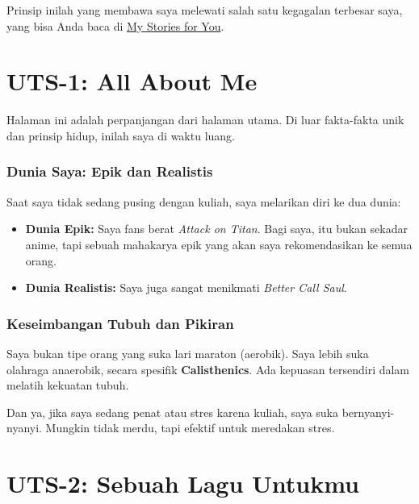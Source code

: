 \documentclass[
  letterpaper,
  DIV=11,
  numbers=noendperiod]{scrreprt}
\providecommand{\tightlist}{%
  \setlength{\itemsep}{0pt}\setlength{\parskip}{0pt}}
\begin{document}
Prinsip inilah yang membawa saya melewati salah satu kegagalan terbesar
saya, yang bisa Anda baca di \href{./My_Stories_for_You/index.qmd}{My
Stories for You}.


\chapter{UTS-1: All About Me}\label{uts-1-all-about-me}

Halaman ini adalah perpanjangan dari halaman utama. Di luar fakta-fakta
unik dan prinsip hidup, inilah saya di waktu luang.

\subsection{Dunia Saya: Epik dan
Realistis}\label{dunia-saya-epik-dan-realistis}

Saat saya tidak sedang pusing dengan kuliah, saya melarikan diri ke dua
dunia:

\begin{itemize}
\tightlist
\item
  \textbf{Dunia Epik:} Saya fans berat \emph{Attack on Titan}. Bagi
  saya, itu bukan sekadar anime, tapi sebuah mahakarya epik yang akan
  saya rekomendasikan ke semua orang.
\item
  \textbf{Dunia Realistis:} Saya juga sangat menikmati \emph{Better Call
  Saul}.
\end{itemize}

\subsection{Keseimbangan Tubuh dan
Pikiran}\label{keseimbangan-tubuh-dan-pikiran}

Saya bukan tipe orang yang suka lari maraton (aerobik). Saya lebih suka
olahraga anaerobik, secara spesifik \textbf{Calisthenics}. Ada kepuasan
tersendiri dalam melatih kekuatan tubuh.

Dan ya, jika saya sedang penat atau stres karena kuliah, saya suka
bernyanyi-nyanyi. Mungkin tidak merdu, tapi efektif untuk meredakan
stres.


\chapter{UTS-2: Sebuah Lagu Untukmu}\label{uts-2-sebuah-lagu-untukmu}
\end{document}
